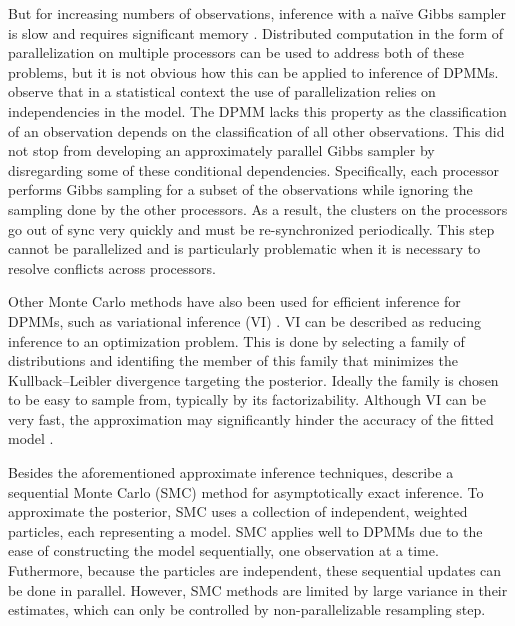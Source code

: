 \documentclass{uwstat572}
\begin{document}
But for increasing numbers of observations, inference with a na\"ive Gibbs sampler is slow and requires significant memory \citep{WDX13}.
Distributed computation in the form of parallelization on multiple processors can be used to address both of these problems, but it is not obvious how this can be applied to inference of DPMMs.
\citet{WDX13} observe that in a statistical context the use of parallelization relies on independencies in the model.
The DPMM lacks this property as the classification of an observation depends on the classification of all other observations.
This did not stop \citet{ASW08} from developing an approximately parallel Gibbs sampler by disregarding some of these conditional dependencies.
Specifically, each processor performs Gibbs sampling for a subset of the observations while ignoring the sampling done by the other processors.
As a result, the clusters on the processors go out of sync very quickly and must be re-synchronized periodically.
This step cannot be parallelized and is particularly problematic when it is necessary to resolve conflicts across processors.

Other Monte Carlo methods have also been used for efficient inference for DPMMs, such as variational inference (VI) \citep{BJ06,TKW07}.
VI can be described as reducing inference to an optimization problem.
This is done by selecting a family of distributions and identifing the member of this family that minimizes the Kullback--Leibler divergence targeting the posterior.
Ideally the family is chosen to be easy to sample from, typically by its factorizability.
Although VI can be very fast, the approximation may significantly hinder the accuracy of the fitted model \citep{WDX13}.

Besides the aforementioned approximate inference techniques, \citet{UBC10} describe a sequential Monte Carlo (SMC) method for asymptotically exact inference.
To approximate the posterior, SMC uses a collection of independent, weighted particles, each representing a model.
SMC applies well to DPMMs due to the ease of constructing the model sequentially, one observation at a time.
Futhermore, because the particles are independent, these sequential updates can be done in parallel.
However, SMC methods are limited by large variance in their estimates, which can only be controlled by non-parallelizable resampling step.
\end{document}

